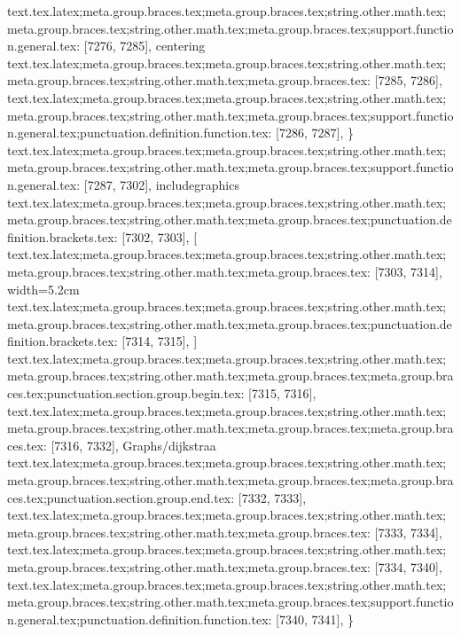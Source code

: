 {{{{{{{{{{{{{{{{{{{{{{{{{{{{{{{{{{{{{{{{{{{{{{{{{{{{{{{{{{{{{{{{{{{{{{{{{{{{{{{{{{{{{{{{{{{{{{{{{{{{{{{{{{{{{{{{{{{{{{{{{{{{{{{{{{{{{{{{{{{{{{{{{{{{{{{{{{{{{{{{{{{{{{{{{{{{{{{{{{{{{{{{{{{{{{{{{{text.tex.latex;meta.group.braces.tex;meta.group.braces.tex;string.other.math.tex;meta.group.braces.tex;string.other.math.tex;meta.group.braces.tex;support.function.general.tex: [7276, 7285], {centering}
text.tex.latex;meta.group.braces.tex;meta.group.braces.tex;string.other.math.tex;meta.group.braces.tex;string.other.math.tex;meta.group.braces.tex: [7285, 7286], { }
text.tex.latex;meta.group.braces.tex;meta.group.braces.tex;string.other.math.tex;meta.group.braces.tex;string.other.math.tex;meta.group.braces.tex;support.function.general.tex;punctuation.definition.function.tex: [7286, 7287], {\}
text.tex.latex;meta.group.braces.tex;meta.group.braces.tex;string.other.math.tex;meta.group.braces.tex;string.other.math.tex;meta.group.braces.tex;support.function.general.tex: [7287, 7302], {includegraphics}
text.tex.latex;meta.group.braces.tex;meta.group.braces.tex;string.other.math.tex;meta.group.braces.tex;string.other.math.tex;meta.group.braces.tex;punctuation.definition.brackets.tex: [7302, 7303], {[}
text.tex.latex;meta.group.braces.tex;meta.group.braces.tex;string.other.math.tex;meta.group.braces.tex;string.other.math.tex;meta.group.braces.tex: [7303, 7314], {width=5.2cm}
text.tex.latex;meta.group.braces.tex;meta.group.braces.tex;string.other.math.tex;meta.group.braces.tex;string.other.math.tex;meta.group.braces.tex;punctuation.definition.brackets.tex: [7314, 7315], {]}
text.tex.latex;meta.group.braces.tex;meta.group.braces.tex;string.other.math.tex;meta.group.braces.tex;string.other.math.tex;meta.group.braces.tex;meta.group.braces.tex;punctuation.section.group.begin.tex: [7315, 7316], {{}
text.tex.latex;meta.group.braces.tex;meta.group.braces.tex;string.other.math.tex;meta.group.braces.tex;string.other.math.tex;meta.group.braces.tex;meta.group.braces.tex: [7316, 7332], {Graphs/dijkstraa}
text.tex.latex;meta.group.braces.tex;meta.group.braces.tex;string.other.math.tex;meta.group.braces.tex;string.other.math.tex;meta.group.braces.tex;meta.group.braces.tex;punctuation.section.group.end.tex: [7332, 7333], {}}
text.tex.latex;meta.group.braces.tex;meta.group.braces.tex;string.other.math.tex;meta.group.braces.tex;string.other.math.tex;meta.group.braces.tex: [7333, 7334], {
}
text.tex.latex;meta.group.braces.tex;meta.group.braces.tex;string.other.math.tex;meta.group.braces.tex;string.other.math.tex;meta.group.braces.tex: [7334, 7340], {      }
text.tex.latex;meta.group.braces.tex;meta.group.braces.tex;string.other.math.tex;meta.group.braces.tex;string.other.math.tex;meta.group.braces.tex;support.function.general.tex;punctuation.definition.function.tex: [7340, 7341], {\}
}}}}}}}}}}}}}}}}}}}}}}}}}}}}}}}}}}}}}}}}}}}}}}}}}}}}}}}}}}}}}}}}}}}}}}}}}}}}}}}}}}}}}}}}}}}}}}}}}}}}}}}}}}}}}}}}}}}}}}}}}}}}}}}}}}}}}}}}}}}}}}}}}}}}}}}}}}}}}}}}}}}}}}}}}}}}}}}}}}}}}}}}}}}}}}}}}}}}

